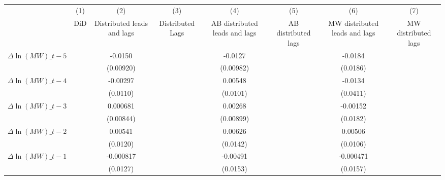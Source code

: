 {
\def\sym#1{\ifmmode^{#1}\else\(^{#1}\)\fi}
\begin{tabular}{l*{7}{c}}
\hline\hline
          &\multicolumn{1}{c}{(1)}&\multicolumn{1}{c}{(2)}&\multicolumn{1}{c}{(3)}&\multicolumn{1}{c}{(4)}&\multicolumn{1}{c}{(5)}&\multicolumn{1}{c}{(6)}&\multicolumn{1}{c}{(7)}\\
          &\multicolumn{1}{c}{DiD}&\multicolumn{1}{c}{Distributed leads and lags}&\multicolumn{1}{c}{Distributed Lags}&\multicolumn{1}{c}{AB distributed leads and lags}&\multicolumn{1}{c}{AB distributed lags}&\multicolumn{1}{c}{MW distributed leads and lags}&\multicolumn{1}{c}{MW distributed lags}\\
\hline
$\Delta \ln(MW)\_{t-5}$&                  &  -0.0150         &                  &  -0.0127         &                  &  -0.0184         &                  \\
          &                  &(0.00920)         &                  &(0.00982)         &                  & (0.0186)         &                  \\
[1em]
$\Delta \ln(MW)\_{t-4}$&                  & -0.00297         &                  &  0.00548         &                  &  -0.0134         &                  \\
          &                  & (0.0110)         &                  & (0.0101)         &                  & (0.0411)         &                  \\
[1em]
$\Delta \ln(MW)\_{t-3}$&                  & 0.000681         &                  &  0.00268         &                  & -0.00152         &                  \\
          &                  &(0.00844)         &                  &(0.00899)         &                  & (0.0182)         &                  \\
[1em]
$\Delta \ln(MW)\_{t-2}$&                  &  0.00541         &                  &  0.00626         &                  &  0.00506         &                  \\
          &                  & (0.0120)         &                  & (0.0142)         &                  & (0.0106)         &                  \\
[1em]
$\Delta \ln(MW)\_{t-1}$&                  &-0.000817         &                  & -0.00491         &                  &-0.000471         &                  \\
          &                  & (0.0127)         &                  & (0.0153)         &                  & (0.0157)         &                  \\

\end{tabular}}
